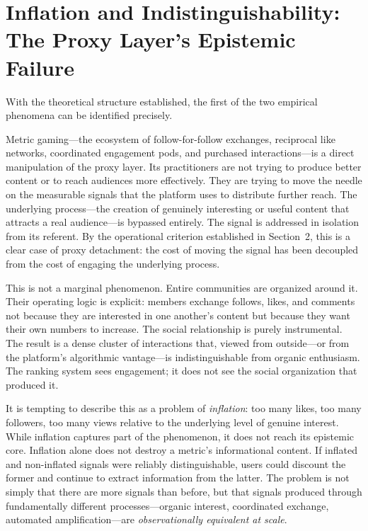 \documentclass[12pt, a4paper]{article}
\begin{document}
\section{Inflation and Indistinguishability: The Proxy Layer's Epistemic Failure}

With the theoretical structure established, the first of the two empirical phenomena can be identified precisely.

Metric gaming---the ecosystem of follow-for-follow exchanges, reciprocal like networks, coordinated engagement pods, and purchased interactions---is a direct manipulation of the proxy layer. Its practitioners are not trying to produce better content or to reach audiences more effectively. They are trying to move the needle on the measurable signals that the platform uses to distribute further reach. The underlying process---the creation of genuinely interesting or useful content that attracts a real audience---is bypassed entirely. The signal is addressed in isolation from its referent. By the operational criterion established in Section~2, this is a clear case of proxy detachment: the cost of moving the signal has been decoupled from the cost of engaging the underlying process.

This is not a marginal phenomenon. Entire communities are organized around it. Their operating logic is explicit: members exchange follows, likes, and comments not because they are interested in one another's content but because they want their own numbers to increase. The social relationship is purely instrumental. The result is a dense cluster of interactions that, viewed from outside---or from the platform's algorithmic vantage---is indistinguishable from organic enthusiasm. The ranking system sees engagement; it does not see the social organization that produced it.

It is tempting to describe this as a problem of \textit{inflation}: too many likes, too many followers, too many views relative to the underlying level of genuine interest. While inflation captures part of the phenomenon, it does not reach its epistemic core. Inflation alone does not destroy a metric's informational content. If inflated and non-inflated signals were reliably distinguishable, users could discount the former and continue to extract information from the latter. The problem is not simply that there are more signals than before, but that signals produced through fundamentally different processes---organic interest, coordinated exchange, automated amplification---are \textit{observationally equivalent at scale}.
\end{document}
